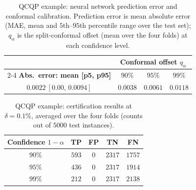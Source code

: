 \documentclass[10pt]{article} %
\theoremstyle{plain}
\theoremstyle{definition}
\theoremstyle{remark}
\begin{document}
\begin{table}[H]
\centering
\caption{QCQP example: neural network prediction error and conformal calibration. Prediction error is mean absolute error (MAE, mean and $5$th--$95$th percentile range over the test set); $q_\alpha$ is the split-conformal offset (mean over the four folds) at each confidence level.}
\begin{tabular}{c ccc}
\toprule
& \multicolumn{3}{c}{\textbf{Conformal offset } $q_\alpha$} \\
\cmidrule(lr){2-4}
\textbf{Abs.\ error: mean [p5, p95]} & $90\%$ & $95\%$ & $99\%$ \\
\midrule
$0.0022\ [0.00,\,0.0094]$ & $0.0038$ & $0.0061$ & $0.0118$ \\
\bottomrule
\end{tabular}
\label{tab:QCQP-error}
\end{table}

\begin{table}[H]
\centering
\caption{QCQP example: certification results at $\delta = 0.1\%$, averaged over the four folds (counts out of $5000$ test instances).}
\begin{tabular}{c cccc}
\toprule
\textbf{Confidence } $1-\alpha$ & \textbf{TP} & \textbf{FP} & \textbf{TN} & \textbf{FN} \\
\midrule
$90\%$ & $593$ & $0$ & $2317$ & $1757$ \\
$95\%$ & $436$ & $0$ & $2317$ & $1914$ \\
$99\%$ & $212$ & $0$ & $2317$ & $2138$ \\
\bottomrule
\end{tabular}
\label{tab:QCQP-cert}
\end{table}
\end{document}
